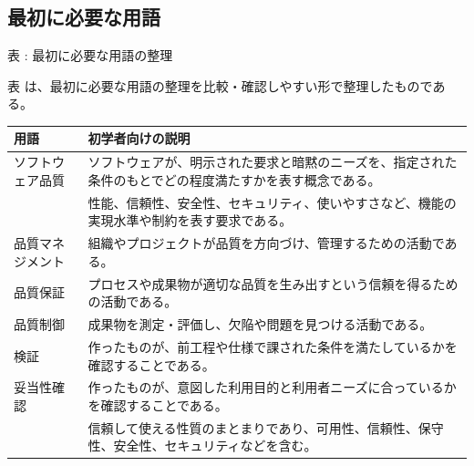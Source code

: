 \subsection*{最初に必要な用語}

\noindent\par\smallskip\noindent{}\label{tab:ch12-01}表 \thetable: 最初に必要な用語の整理\par\smallskip
表 \thetable は、最初に必要な用語の整理を比較・確認しやすい形で整理したものである。\par\smallskip
\begin{tabularx}{\textwidth}{L{0.27\textwidth}Y}
\toprule
用語 & 初学者向けの説明 \\
\midrule
ソフトウェア品質 & ソフトウェアが、明示された要求と暗黙のニーズを、指定された条件のもとでどの程度満たすかを表す概念である。 \\
 & 性能、信頼性、安全性、セキュリティ、使いやすさなど、機能の実現水準や制約を表す要求である。 \\
品質マネジメント & 組織やプロジェクトが品質を方向づけ、管理するための活動である。 \\
品質保証 & プロセスや成果物が適切な品質を生み出すという信頼を得るための活動である。 \\
品質制御 & 成果物を測定・評価し、欠陥や問題を見つける活動である。 \\
検証 & 作ったものが、前工程や仕様で課された条件を満たしているかを確認することである。 \\
妥当性確認 & 作ったものが、意図した利用目的と利用者ニーズに合っているかを確認することである。 \\
 & 信頼して使える性質のまとまりであり、可用性、信頼性、保守性、安全性、セキュリティなどを含む。 \\
\bottomrule
\end{tabularx}
